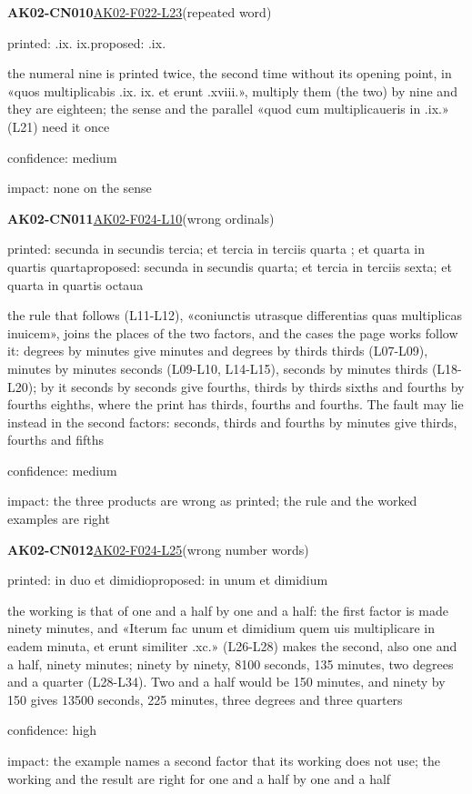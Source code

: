 \documentclass[11pt]{article}
\begin{document}
\noindent\textbf{AK02-CN010}\enspace\hyperlink{AK02-F022-L23}{AK02-F022-L23}\enspace(repeated word)\par\noindent printed: .ix. ix.\enspace proposed: .ix.\par\noindent the numeral nine is printed twice, the second time without its opening point, in «quos multiplicabis .ix. ix. et erunt .xviii.», multiply them (the two) by nine and they are eighteen; the sense and the parallel «quod cum multiplicaueris in .ix.» (L21) need it once\par\noindent confidence: medium\par\noindent impact: none on the sense\par\medskip
\noindent\textbf{AK02-CN011}\enspace\hyperlink{AK02-F024-L10}{AK02-F024-L10}\enspace(wrong ordinals)\par\noindent printed: secunda in secundis tercia; et tercia in terciis quarta ; et quarta in quartis quarta\enspace proposed: secunda in secundis quarta; et tercia in terciis sexta; et quarta in quartis octaua\par\noindent the rule that follows (L11-L12), «coniunctis utrasque differentias quas multiplicas inuicem», joins the places of the two factors, and the cases the page works follow it: degrees by minutes give minutes and degrees by thirds thirds (L07-L09), minutes by minutes seconds (L09-L10, L14-L15), seconds by minutes thirds (L18-L20); by it seconds by seconds give fourths, thirds by thirds sixths and fourths by fourths eighths, where the print has thirds, fourths and fourths. The fault may lie instead in the second factors: seconds, thirds and fourths by minutes give thirds, fourths and fifths\par\noindent confidence: medium\par\noindent impact: the three products are wrong as printed; the rule and the worked examples are right\par\medskip
\noindent\textbf{AK02-CN012}\enspace\hyperlink{AK02-F024-L25}{AK02-F024-L25}\enspace(wrong number words)\par\noindent printed: in duo et dimidio\enspace proposed: in unum et dimidium\par\noindent the working is that of one and a half by one and a half: the first factor is made ninety minutes, and «Iterum fac unum et dimidium quem uis multiplicare in eadem minuta, et erunt similiter .xc.» (L26-L28) makes the second, also one and a half, ninety minutes; ninety by ninety, 8100 seconds, 135 minutes, two degrees and a quarter (L28-L34). Two and a half would be 150 minutes, and ninety by 150 gives 13500 seconds, 225 minutes, three degrees and three quarters\par\noindent confidence: high\par\noindent impact: the example names a second factor that its working does not use; the working and the result are right for one and a half by one and a half\par\medskip
\end{document}
